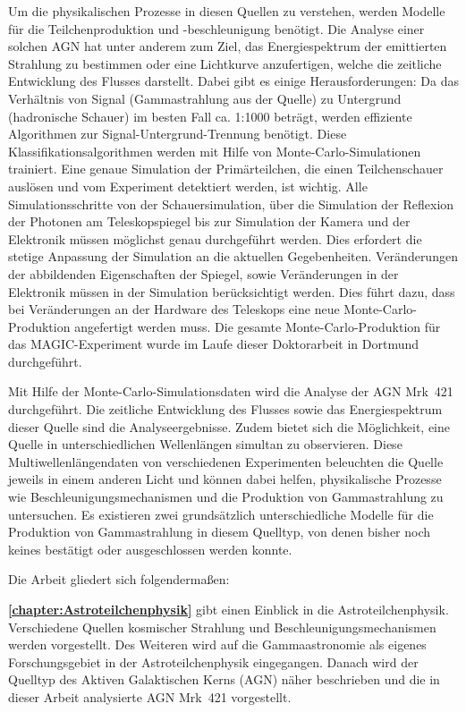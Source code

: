 Um die physikalischen Prozesse in diesen Quellen zu verstehen, werden Modelle für die Teilchenproduktion und -beschleunigung benötigt.
Die Analyse einer solchen AGN hat unter anderem zum Ziel, das Energiespektrum der emittierten Strahlung zu bestimmen oder eine Lichtkurve anzufertigen, welche die zeitliche Entwicklung des Flusses darstellt.
Dabei gibt es einige Herausforderungen:
Da das Verhältnis von Signal (Gammastrahlung aus der Quelle) zu Untergrund (hadronische Schauer) im besten Fall ca. 1:1000 beträgt, werden effiziente Algorithmen zur Signal-Untergrund-Trennung benötigt.
Diese Klassifikationsalgorithmen werden mit Hilfe von Monte-Carlo-Simulationen trainiert.
Eine genaue Simulation der Primärteilchen, die einen Teilchenschauer auslösen und vom Experiment detektiert werden, ist wichtig.
Alle Simulationsschritte von der Schauersimulation, über die Simulation der Reflexion der Photonen am Teleskopspiegel bis zur Simulation der Kamera und der Elektronik müssen möglichst genau durchgeführt werden.
Dies erfordert die stetige Anpassung der Simulation an die aktuellen Gegebenheiten.
Veränderungen der abbildenden Eigenschaften der Spiegel, sowie Veränderungen in der Elektronik müssen in der Simulation berücksichtigt werden.
Dies führt dazu, dass bei Veränderungen an der Hardware des Teleskops eine neue Monte-Carlo-Produktion angefertigt werden muss.
Die gesamte Monte-Carlo-Produktion für das MAGIC-Experiment wurde im Laufe dieser Doktorarbeit in Dortmund durchgeführt.

Mit Hilfe der Monte-Carlo-Simulationsdaten wird die Analyse der AGN Mrk~421 durchgeführt.
Die zeitliche Entwicklung des Flusses sowie das Energiespektrum dieser Quelle sind die Analyseergebnisse.
Zudem bietet sich die Möglichkeit, eine Quelle in unterschiedlichen Wellenlängen simultan zu observieren.
Diese Multiwellenlängendaten von verschiedenen Experimenten beleuchten die Quelle jeweils in einem anderen Licht und können dabei helfen, physikalische Prozesse wie Beschleunigungsmechanismen und die Produktion von Gammastrahlung zu untersuchen.
Es existieren zwei grundsätzlich unterschiedliche Modelle für die Produktion von Gammastrahlung in diesem Quelltyp, von denen bisher noch keines bestätigt oder ausgeschlossen werden konnte.\newline

Die Arbeit gliedert sich folgendermaßen:

\textbf{\autoref{chapter:Astroteilchenphysik}} gibt einen Einblick in die Astroteilchenphysik. 
Verschiedene Quellen kosmischer Strahlung und Beschleunigungsmechanismen werden vorgestellt. 
Des Weiteren wird auf die Gammaastronomie als eigenes Forschungsgebiet in der Astroteilchenphysik eingegangen. 
Danach wird der Quelltyp des Aktiven Galaktischen Kerns (AGN) näher beschrieben und die in dieser Arbeit analysierte AGN Mrk~421 vorgestellt.


